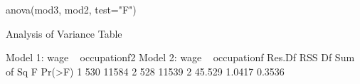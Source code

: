 \begin{Schunk}
\begin{Sinput}
 anova(mod3, mod2, test="F")
\end{Sinput}
\begin{Soutput}
Analysis of Variance Table

Model 1: wage ~ occupationf2
Model 2: wage ~ occupationf
  Res.Df   RSS Df Sum of Sq      F Pr(>F)
1    530 11584                           
2    528 11539  2    45.529 1.0417 0.3536
\end{Soutput}
\end{Schunk}
